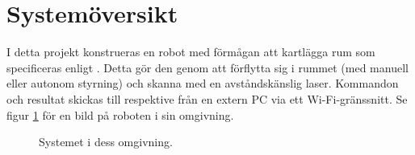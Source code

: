\documentclass[a4paper,11pt]{article}
\begin{document}
\pagestyle{intro}
\LIPStitelsida
\clearpage
\begin{LIPSprojektidentitet}
\end{LIPSprojektidentitet}

\clearpage
\renewcommand{\familydefault}{\sfdefault}	%
\normalfont
\tableofcontents
\renewcommand{\familydefault}{\rmdefault}	%
\normalfont
\clearpage
\begin{LIPSdokumenthistorik}
    \LIPSversionsinfo{}{}{}{}{}
\end{LIPSdokumenthistorik}
\clearpage
\setcounter{page}{1}
\pagestyle{content}

\section{Systemöversikt}
I detta projekt konstrueras en robot med förmågan att kartlägga rum som specificeras enligt \cite{coursespec}. Detta gör den genom att förflytta sig i rummet (med manuell eller autonom styrning) och skanna med en avståndskänslig laser. Kommandon och resultat skickas till respektive från en extern PC via ett Wi-Fi-gränssnitt. Se figur \ref{fig:overview} för en bild på roboten i sin omgivning.

\begin{figure}[h!]
    \caption{Systemet i dess omgivning.}
    \label{fig:overview}
\end{figure}
\end{document}
